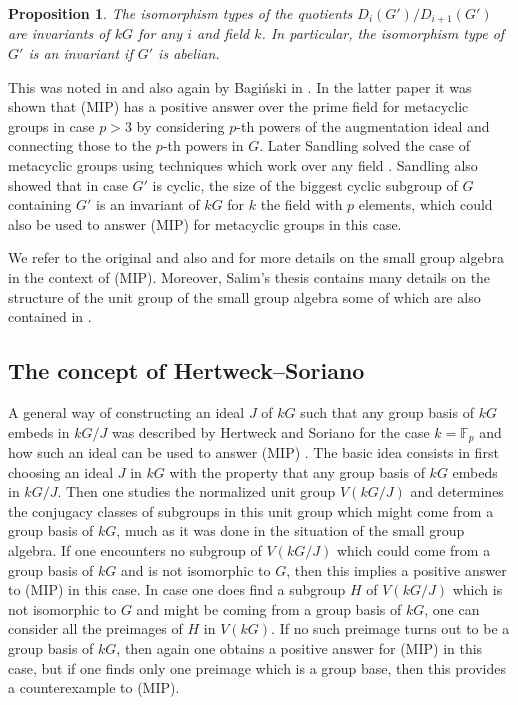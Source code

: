 \documentclass[11pt, a4paper]{amsart}
\newtheorem{proposition}[theorem]{Proposition}
\theoremstyle{definition}
\begin{document}
\begin{proposition}
The isomorphism types of the quotients $D_i(G')/D_{i+1}(G')$ are invariants of $kG$ for any $i$ and field $k$. In particular, the isomorphism type of $G'$ is an invariant if $G'$ is abelian.
\end{proposition}
This was noted in \cite{SandlingSurvey} and also again by Bagi\'nski in \cite{BaginskiMetacyclic}. In the latter paper it was shown that (MIP) has a positive answer over the prime field for metacyclic groups in case $p >3$ by considering $p$-th powers of the augmentation ideal and connecting those to the $p$-th powers in $G$. Later Sandling solved the case of metacyclic groups using techniques which work over any field \cite{SandlingMetacyclic}. Sandling also showed that in case $G'$ is cyclic, the size of the biggest cyclic subgroup of $G$ containing $G'$ is an invariant of $kG$ for $k$ the field with $p$ elements, which could also be used to answer (MIP) for metacyclic groups in this case.

We refer to the original \cite{Sandling89} and also \cite[Section 2.3]{HertweckSoriano06} and \cite{MargolisStanojkovski21} for more details on the small group algebra in the context of (MIP). Moreover, Salim's thesis contains many details on the structure of the unit group of the small group algebra \cite{SalimThesis} some of which are also contained in \cite{SalimSandlingSmallGroupRing}.

\subsection{The concept of Hertweck--Soriano}

A general way of constructing an ideal $J$ of $kG$ such that any group basis of $kG$ embeds in $kG/J$ was described by Hertweck and Soriano for the case $k = \mathbb{F}_p$ and how such an ideal can be used to answer (MIP)  \cite{HertweckSoriano06}. The basic idea consists in first choosing an ideal $J$ in $kG$ with the property that any group basis of $kG$ embeds in $kG/J$. Then one studies the normalized unit group $V(kG/J)$ and determines the conjugacy classes of subgroups in this unit group which might come from a group basis of $kG$, much as it was done in the situation of the small group algebra. If one encounters no subgroup of $V(kG/J)$ which could come from a group basis of $kG$ and is not isomorphic to $G$, then this implies a positive answer to (MIP) in this case. In case one does find a subgroup $H$ of $V(kG/J)$ which is not isomorphic to $G$ and might be coming from a group basis of $kG$, one can consider all the preimages of $H$ in $V(kG)$. If no such preimage turns out to be a group basis of $kG$, then again one obtains a positive answer for (MIP) in this case, but if one finds only one preimage which is a group base, then this provides a counterexample to (MIP).
\end{document}
